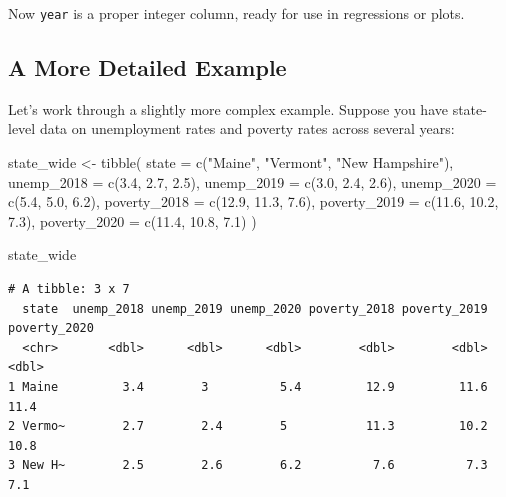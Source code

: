 \documentclass[
  letterpaper,
  DIV=11,
  numbers=noendperiod]{scrreprt}
\newenvironment{Shaded}{\begin{snugshade}}{\end{snugshade}}
\newcommand{\AttributeTok}[1]{\textcolor[rgb]{0.40,0.45,0.13}{#1}}
\newcommand{\FloatTok}[1]{\textcolor[rgb]{0.68,0.00,0.00}{#1}}
\newcommand{\FunctionTok}[1]{\textcolor[rgb]{0.28,0.35,0.67}{#1}}
\newcommand{\NormalTok}[1]{\textcolor[rgb]{0.00,0.23,0.31}{#1}}
\newcommand{\OtherTok}[1]{\textcolor[rgb]{0.00,0.23,0.31}{#1}}
\newcommand{\StringTok}[1]{\textcolor[rgb]{0.13,0.47,0.30}{#1}}
\begin{document}
Now \texttt{year} is a proper integer column, ready for use in
regressions or plots.

\subsection{A More Detailed Example}\label{a-more-detailed-example}

Let's work through a slightly more complex example. Suppose you have
state-level data on unemployment rates and poverty rates across several
years:

\begin{Shaded}
\begin{Highlighting}[]
\NormalTok{state\_wide }\OtherTok{\textless{}{-}} \FunctionTok{tibble}\NormalTok{(}
  \AttributeTok{state =} \FunctionTok{c}\NormalTok{(}\StringTok{"Maine"}\NormalTok{, }\StringTok{"Vermont"}\NormalTok{, }\StringTok{"New Hampshire"}\NormalTok{),}
  \AttributeTok{unemp\_2018 =} \FunctionTok{c}\NormalTok{(}\FloatTok{3.4}\NormalTok{, }\FloatTok{2.7}\NormalTok{, }\FloatTok{2.5}\NormalTok{),}
  \AttributeTok{unemp\_2019 =} \FunctionTok{c}\NormalTok{(}\FloatTok{3.0}\NormalTok{, }\FloatTok{2.4}\NormalTok{, }\FloatTok{2.6}\NormalTok{),}
  \AttributeTok{unemp\_2020 =} \FunctionTok{c}\NormalTok{(}\FloatTok{5.4}\NormalTok{, }\FloatTok{5.0}\NormalTok{, }\FloatTok{6.2}\NormalTok{),}
  \AttributeTok{poverty\_2018 =} \FunctionTok{c}\NormalTok{(}\FloatTok{12.9}\NormalTok{, }\FloatTok{11.3}\NormalTok{, }\FloatTok{7.6}\NormalTok{),}
  \AttributeTok{poverty\_2019 =} \FunctionTok{c}\NormalTok{(}\FloatTok{11.6}\NormalTok{, }\FloatTok{10.2}\NormalTok{, }\FloatTok{7.3}\NormalTok{),}
  \AttributeTok{poverty\_2020 =} \FunctionTok{c}\NormalTok{(}\FloatTok{11.4}\NormalTok{, }\FloatTok{10.8}\NormalTok{, }\FloatTok{7.1}\NormalTok{)}
\NormalTok{)}

\NormalTok{state\_wide}
\end{Highlighting}
\end{Shaded}

\begin{verbatim}
# A tibble: 3 x 7
  state  unemp_2018 unemp_2019 unemp_2020 poverty_2018 poverty_2019 poverty_2020
  <chr>       <dbl>      <dbl>      <dbl>        <dbl>        <dbl>        <dbl>
1 Maine         3.4        3          5.4         12.9         11.6         11.4
2 Vermo~        2.7        2.4        5           11.3         10.2         10.8
3 New H~        2.5        2.6        6.2          7.6          7.3          7.1
\end{verbatim}
\end{document}
